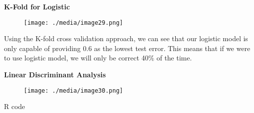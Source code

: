 \documentclass[12pt]{article}
\begin{document}
\vspace{\baselineskip}
\begin{justify}
\textbf{K-Fold for Logistic}
\end{justify}\par




\begin{figure}[H]
	\begin{Center}
		\texttt{[image: ./media/image29.png]}
	\end{Center}
\end{figure}



\par

\begin{justify}
Using the K-fold cross validation approach, we can see that our logistic model is only capable of providing 0.6 as the lowest test error. This means that if we were to use logistic model, we will only be correct 40$\%$  of the time. 
\end{justify}\par


\vspace{\baselineskip}

\vspace{\baselineskip}

\vspace{\baselineskip}

\vspace{\baselineskip}
\begin{justify}
\textbf{Linear Discriminant Analysis}
\end{justify}\par




\begin{figure}[H]
\advance\leftskip -0.14in		\texttt{[image: ./media/image30.png]}
\end{figure}



\begin{justify}
R code
\end{justify}\par
\end{document}
